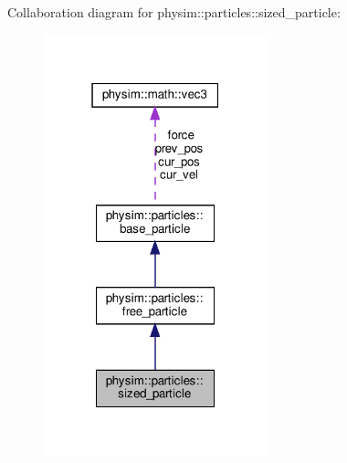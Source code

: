 Collaboration diagram for physim\+:\+:particles\+:\+:sized\+\_\+particle\+:\nopagebreak
\begin{figure}[H]
\begin{center}
\leavevmode
\includegraphics[width=183pt]{classphysim_1_1particles_1_1sized__particle__coll__graph}
\end{center}
\end{figure}
